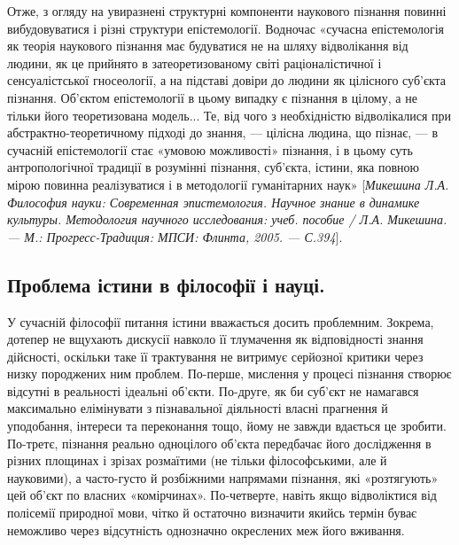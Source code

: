 Отже, з огляду на увиразнені структурні компоненти наукового пізнання
повинні вибудовуватися і різні структури епістемології. Водночас «сучасна
епістемологія як теорія наукового пізнання має будуватися не на шляху
відволікання від людини, як це прийнято в затеоретизованому світі
раціоналістичної і сенсуалістської гносеології, а на підставі довіри до людини
як цілісного суб’єкта пізнання. Об’єктом епістемології в цьому випадку є
пізнання в цілому, а не тільки його теоретизована модель... Те, від чого з
необхідністю відволікалися при абстрактно-теоретичному підході до знання, ---
цілісна людина, що пізнає, --- в сучасній епістемології стає «умовою 
можливості» пізнання, і в цьому суть антропологічної традиції в розумінні
пізнання, суб’єкта, істини, яка повною мірою повинна реалізуватися і в
методології гуманітарних наук» [\textit{Микешина Л.А. Философия науки:
Современная эпистемология. Научное знание в динамике культуры.
Методология научного исследования: учеб. пособие / Л.А. Микешина. --- М.:
Прогресс-Традиция: МПСИ: Флинта, 2005. --- С.394}].

\subsection{Проблема істини в філософії і науці.}
У сучасній філософії питання
істини вважається досить проблемним. Зокрема, дотепер не вщухають дискусії
навколо її тлумачення як відповідності знання дійсності, оскільки таке її
трактування не витримує серйозної критики через низку породжених ним
проблем. По-перше, мислення у процесі пізнання створює відсутні в реальності
ідеальні об’єкти. По-друге, як би суб’єкт не намагався максимально елімінувати
з пізнавальної діяльності власні прагнення й уподобання, інтереси та
переконання тощо, йому не завжди вдається це зробити. По-третє, пізнання
реально одноцілого об’єкта передбачає його дослідження в різних площинах і
зрізах розмаїтими (не тільки філософськими, але й науковими), а часто-густо й
розбіжними напрямами пізнання, які «розтягують» цей об’єкт по власних
«комірчинах». По-четверте, навіть якщо відволіктися від полісемії природної
мови, чітко й остаточно визначити якийсь термін буває неможливо через
відсутність однозначно окреслених меж його вживання.

